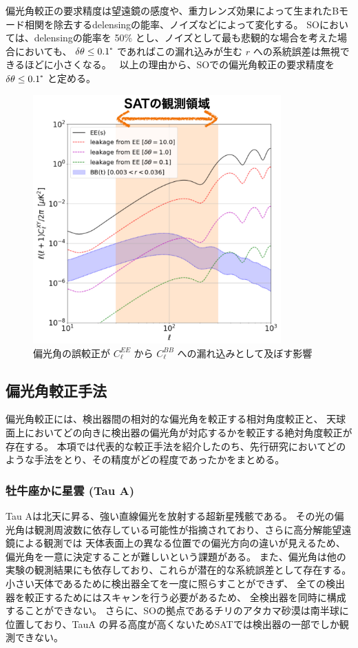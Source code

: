 \documentclass[../../main.tex]{subfiles}
\begin{document}
偏光角較正の要求精度は望遠鏡の感度や、重力レンズ効果によって生まれたBモード相関を除去するdelensingの能率、ノイズなどによって変化する。
SOにおいては、delensingの能率を 50\% とし、ノイズとして最も悲観的な場合を考えた場合においても、
$\delta\theta \leq 0.1\tcdegree$ であればこの漏れ込みが生む $r$ への系統誤差は無視できるほどに小さくなる。~\cite{so:Bryan_2018}
以上の理由から、SOでの偏光角較正の要求精度を $\delta\theta \leq 0.1\tcdegree$ と定める。

\begin{figure}[H]
    \centering
    \includegraphics[width=0.85\textwidth]{simons_observatory/EtoB_leakage.pdf}
    \caption{偏光角の誤較正が $C_{\ell}^{EE}$ から $C_{\ell}^{BB}$ への漏れ込みとして及ぼす影響}
    \label{fig:so-EtoBleakage}
\end{figure}

\subsection{偏光角較正手法}
偏光角較正には、検出器間の相対的な偏光角を較正する相対角度較正と、
天球面上においてどの向きに検出器の偏光角が対応するかを較正する絶対角度較正が存在する。
本項では代表的な較正手法を紹介したのち、先行研究においてどのような手法をとり、その精度がどの程度であったかをまとめる。
\subsubsection{牡牛座かに星雲 (Tau A)}
Tau Aは北天に昇る、強い直線偏光を放射する超新星残骸である。
その光の偏光角は観測周波数に依存している可能性が指摘されており、さらに高分解能望遠鏡による観測では
天体表面上の異なる位置での偏光方向の違いが見えるため、偏光角を一意に決定することが難しいという課題がある。
また、偏光角は他の実験の観測結果にも依存しており、これらが潜在的な系統誤差として存在する。
小さい天体であるために検出器全てを一度に照らすことができず、
全ての検出器を較正するためにはスキャンを行う必要があるため、
全検出器を同時に構成することができない。
さらに、SOの拠点であるチリのアタカマ砂漠は南半球に位置しており、TauA の昇る高度が高くないためSATでは検出器の一部でしか観測できない。
\end{document}
